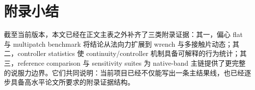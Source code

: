 \documentclass[11pt,a4paper]{ctexart}
\begin{document}


\section{附录小结}
截至当前版本，本文已经在正文主表之外补齐了三类附录证据：其一，偏心 flat 与 multipatch benchmark 将结论从法向力扩展到 wrench 与多接触片动态；其二，controller statistics 使 continuity/controller 机制具备可解释的行为统计；其三，reference comparison 与 sensitivity suites 为 native-band 主链提供了更完整的说服力边界。它们共同说明：当前项目已经不仅能写出一条主结果线，也已经逐步具备高水平论文所要求的附录证据结构。
\end{document}
